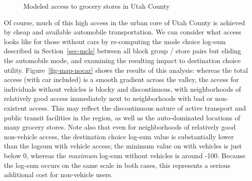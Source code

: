 \documentclass[
  letterpaper,
  number,
  review,
  3p]{elsarticle}
\begin{document}
\begin{figure}


\caption{\label{fig-map-ut}Modeled access to grocery stores in Utah
County}

\end{figure}%

Of course, much of this high access in the urban core of Utah County is
achieved by cheap and available automobile transportation. We can
consider what access looks like for those without cars by re-computing
the mode choice log-sum described in Section~\ref{sec-mcls} between all
block group / store pairs but eliding the automobile mode, and examining
the resulting impact to destination choice utility.
Figure~\ref{fig-map-nocar} shows the results of this analysis: whereas
the total access (with car included) is a smooth gradient across the
valley, the access for individuals without vehicles is blocky and
discontinuous, with neighborhoods of relatively good access immediately
next to neighborhoods with bad or non-existent access. This may reflect
the discontinuous nature of active transport and public transit
facilities in the region, as well as the auto-dominated locations of
many grocery stores. Note also that even for neighborhoods of relatively
good non-vehicle access, the destination choice log-sum value is
substantially lower than the logsum with vehicle access; the minimum
value on with vehicles is just below 0, whereas the \emph{maximum}
log-sum without vehicles is around -100. Because the log-sum occurs on
the same scale in both cases, this represents a serious additional cost
for non-vehicle users.

\begin{sidewaysfigure}

\begin{minipage}{0.50\linewidth}



\end{minipage}%
%
\begin{minipage}{0.50\linewidth}



\end{minipage}%

\caption{\label{fig-map-nocar}Access to groceries in Salt Lake County
with and without a vehicle.}

\end{sidewaysfigure}%
\end{document}
